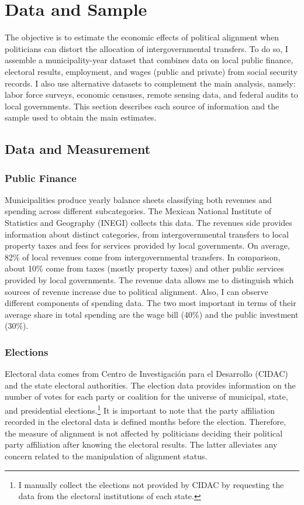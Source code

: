 \documentclass[dv_diss_main.tex]{subfiles}
\begin{document}
\section{Data and Sample}

The objective is to estimate the economic effects of political alignment when politicians can distort the allocation of intergovernmental transfers. To do so, I assemble a municipality-year dataset that combines data on local public finance, electoral results, employment, and wages (public and private) from social security records. I also use alternative datasets to complement the main analysis, namely: labor force surveys, economic censuses, remote sensing data, and federal audits to local governments. This section describes each source of information and the sample used to obtain the main estimates.


\subsection{Data and Measurement}
\subsubsection{Public Finance}  Municipalities produce yearly balance sheets classifying both revenues and spending across different subcategories. The Mexican National Institute of Statistics and Geography (INEGI) collects this data. The revenues side provides information about distinct categories, from intergovernmental transfers to local property taxes and fees for services provided by local governments. On average, 82\% of local revenues come from intergovernmental transfers. In comparison, about 10\% come from taxes (mostly property taxes) and other public services provided by local governments. The revenue data allows me to distinguish which sources of revenue increase due to political alignment. Also, I can observe different components of spending data. The two most important in terms of their average share in total spending are the wage bill (40\%) and the public investment (30\%).

\subsubsection{Elections} Electoral data comes from Centro de Investigación para el Desarrollo (CIDAC) and the state electoral authorities. The election data provides information on the number of votes for each party or coalition for the universe of municipal, state, and presidential elections.\footnote{ I manually collect the elections not provided by CIDAC by requesting the data from the electoral institutions of each state.}
It is important to note that the party affiliation recorded in the electoral data is defined months before the election. Therefore, the measure of alignment is not affected by politicians deciding their political party affiliation after knowing the electoral results. The latter alleviates any concern related to the manipulation of alignment status. 
\end{document}
